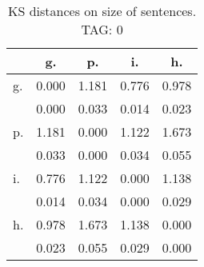 \begin{table}[h!]
\begin{center}
\begin{tabular}{| l | c | c | c | c |}\hline
 & g. & p. & i. & h. \\\hline
g. & 0.000  & 1.181  & 0.776  & 0.978 \\\hline
 & 0.000  & 0.033  & 0.014  & 0.023 \\\hline
p. & 1.181  & 0.000  & 1.122  & 1.673 \\\hline
 & 0.033  & 0.000  & 0.034  & 0.055 \\\hline
i. & 0.776  & 1.122  & 0.000  & 1.138 \\\hline
 & 0.014  & 0.034  & 0.000  & 0.029 \\\hline
h. & 0.978  & 1.673  & 1.138  & 0.000 \\\hline
 & 0.023  & 0.055  & 0.029  & 0.000 \\\hline
\end{tabular}
\caption{KS distances on size of sentences. TAG: 0}
\end{center}
\end{table}